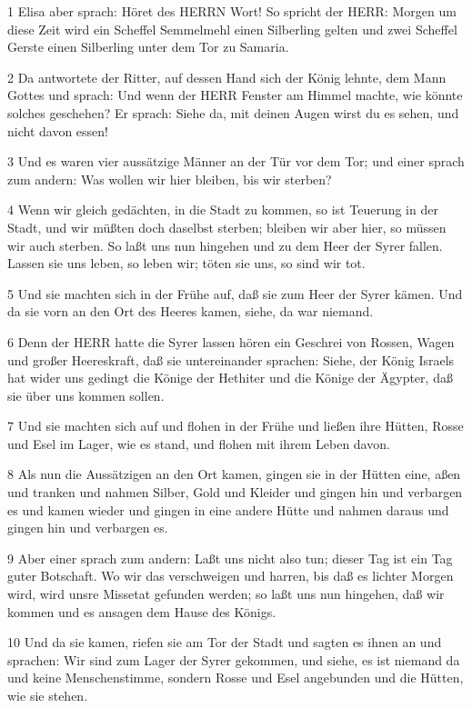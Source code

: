 \par 1 Elisa aber sprach: Höret des HERRN Wort! So spricht der HERR: Morgen um diese Zeit wird ein Scheffel Semmelmehl einen Silberling gelten und zwei Scheffel Gerste einen Silberling unter dem Tor zu Samaria.
\par 2 Da antwortete der Ritter, auf dessen Hand sich der König lehnte, dem Mann Gottes und sprach: Und wenn der HERR Fenster am Himmel machte, wie könnte solches geschehen? Er sprach: Siehe da, mit deinen Augen wirst du es sehen, und nicht davon essen!
\par 3 Und es waren vier aussätzige Männer an der Tür vor dem Tor; und einer sprach zum andern: Was wollen wir hier bleiben, bis wir sterben?
\par 4 Wenn wir gleich gedächten, in die Stadt zu kommen, so ist Teuerung in der Stadt, und wir müßten doch daselbst sterben; bleiben wir aber hier, so müssen wir auch sterben. So laßt uns nun hingehen und zu dem Heer der Syrer fallen. Lassen sie uns leben, so leben wir; töten sie uns, so sind wir tot.
\par 5 Und sie machten sich in der Frühe auf, daß sie zum Heer der Syrer kämen. Und da sie vorn an den Ort des Heeres kamen, siehe, da war niemand.
\par 6 Denn der HERR hatte die Syrer lassen hören ein Geschrei von Rossen, Wagen und großer Heereskraft, daß sie untereinander sprachen: Siehe, der König Israels hat wider uns gedingt die Könige der Hethiter und die Könige der Ägypter, daß sie über uns kommen sollen.
\par 7 Und sie machten sich auf und flohen in der Frühe und ließen ihre Hütten, Rosse und Esel im Lager, wie es stand, und flohen mit ihrem Leben davon.
\par 8 Als nun die Aussätzigen an den Ort kamen, gingen sie in der Hütten eine, aßen und tranken und nahmen Silber, Gold und Kleider und gingen hin und verbargen es und kamen wieder und gingen in eine andere Hütte und nahmen daraus und gingen hin und verbargen es.
\par 9 Aber einer sprach zum andern: Laßt uns nicht also tun; dieser Tag ist ein Tag guter Botschaft. Wo wir das verschweigen und harren, bis daß es lichter Morgen wird, wird unsre Missetat gefunden werden; so laßt uns nun hingehen, daß wir kommen und es ansagen dem Hause des Königs.
\par 10 Und da sie kamen, riefen sie am Tor der Stadt und sagten es ihnen an und sprachen: Wir sind zum Lager der Syrer gekommen, und siehe, es ist niemand da und keine Menschenstimme, sondern Rosse und Esel angebunden und die Hütten, wie sie stehen.
